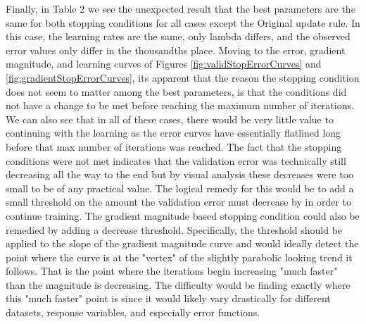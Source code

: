 \documentclass[runningheads]{llncs}
\begin{document}
Finally, in Table 2 we see the unexpected result that the best parameters are the same for both stopping conditions for all cases except the Original update rule. In this case, the learning rates are the same, only lambda differs, and the observed error values only differ in the thousandths place. Moving to the error, gradient magnitude, and learning curves of Figures \ref{fig:validStopErrorCurves} and \ref{fig:gradientStopErrorCurves}, its apparent that the reason the stopping condition does not seem to matter among the best parameters, is that the conditions did not have a change to be met before reaching the maximum number of iterations. We can also see that in all of these cases, there would be very little value to continuing with the learning as the error curves have essentially flatlined long before that max number of iterations was reached. The fact that the stopping conditions were not met indicates that the validation error was technically still decreasing all the way to the end but by visual analysis these decreases were too small to be of any practical value. The logical remedy for this would be to add a small threshold on the amount the validation error must decrease by in order to continue training. The gradient magnitude based stopping condition could also be remedied by adding a decrease threshold. Specifically, the threshold should be applied to the slope of the gradient magnitude curve and would ideally detect the point where the curve is at the "vertex" of the slightly parabolic looking trend it follows. That is the point where the iterations begin increasing "much faster" than the magnitude is decreasing. The difficulty would be finding exactly where this "much faster" point is since it would likely vary drastically for different datasets, response variables, and especially error functions.
\end{document}
